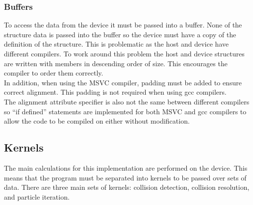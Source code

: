 \documentclass[10pt,a4paper,titlepage]{report}
\begin{document}
\subsubsection{Buffers}
To access the data from the device it must be passed into a buffer. None of the structure data is passed into the buffer so the device must have a copy of the definition of the structure. This is problematic as the host and device have different compilers. To work around this problem the host and device structures are written with members in descending order of size. This encourages the compiler to order them correctly.
\\In addition, when using the MSVC compiler, padding must be added to ensure correct alignment. This padding is not required when using gcc compilers. 
\\The alignment attribute specifier is also not the same between different compilers so ``if defined'' statements are implemented for both MSVC and gcc compilers to allow the code to be compiled on either without modification.
\subsection{Kernels}
The main calculations for this implementation are performed on the device. This means that the program must be separated into kernels to be passed over sets of data. There are three main sets of kernels: collision detection, collision resolution, and particle iteration.
\end{document}
